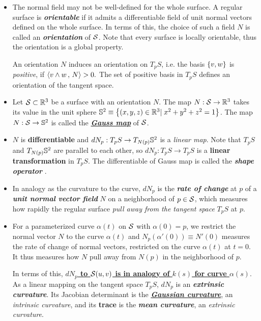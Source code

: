 \documentclass[11pt]{article}
\begin{document}
\begin{itemize}
\item The normal field may not be well-defined for the whole surface. A regular surface is \emph{\textbf{orientable}} if it admits a differentiable  field  of unit normal vectors defined on the whole surface. In terms of this, the choice of such a field $N$ is called an \emph{\textbf{orientation}} of ${\mathcal S}$. Note that every surface is locally orientable, thus the orientation is a global property. 

 An orientation $N$ induces an orientation on $T_{p}S$, i.e. the basis $\left\{v,w\right\}$ is \emph{positive}, if $\left\langle v\wedge w\,,\, N \right\rangle>0.$ The set of positive basis in $T_{p}S$ defines an orientation of the tangent space. 

 \item \begin{definition}
 Let ${\mathcal S}\subset {\mathbb R}^{3}$ be a surface with an orientation $N$. The map $N: {\mathcal S} \rightarrow {\mathbb R}^{3}$ takes its value in the unit sphere ${\mathbb S}^{2}\equiv \left\{(x,y,z)\in {\mathbb R}^{3}|\;  x^{2}+ y^{2}+ z^{2} =1 \right\}$.  The map $N: {\mathcal S} \rightarrow {\mathbb S}^{2}$ is called the \underline{\emph{\textbf{Gauss map}}} of ${\mathcal S}$.
 \end{definition}
 
 \item $N$ is \textbf{differentiable} and $dN_{p}: T_{p}S \rightarrow T_{N(p)}{\mathbb S}^{2}$ is a \emph{linear map}. Note that $T_{p}S$ and $T_{N(p)}{\mathbb S}^{2}$ are parallel to each other, so $dN_{p}: T_{p}S \rightarrow T_{p}S$ is a \textbf{linear transformation} in $T_{p}S$. The differentiable of Gauss map is called the \emph{\textbf{shape operator}} \citep{o2006elementary}. 

\item In analogy as the curvature to the curve, $dN_{p}$ is the \emph{\textbf{rate of change}} at $p$ of a \emph{\textbf{unit normal vector field}} $N$  on a neighborhood of $p\in {\mathcal S}$, which measures how rapidly the regular surface \emph{pull away from the tangent space} $T_{p}S$ at $p$.


\item For a parameterized curve $\alpha(t)$ on ${\mathcal S}$ with $\alpha(0) = p$, we restrict the normal vector $N$ to the curve $\alpha(t)$ and $N_{p}(\alpha'(0)) \equiv N'(0)$ measures the rate of change of normal vectors, restricted on the curve $\alpha(t)$ at $t=0$. It thus measures how $N$ pull away from $N(p)$ in the neighborhood of $p$.  

In terms of this, \underline{\textbf{$dN_{p} $ to ${\mathcal S}(u,v)$  is in analogy of $k(s)$ for curve $\alpha(s)$}}. As a linear mapping on the tangent space $T_{p}S$, $dN_{p}$ is an \emph{\textbf{extrinsic curvature}}. Its Jacobian determinant is the \underline{\emph{\textbf{Gaussian curvature}}}, an \emph{intrinsic curvature}, and its \textbf{trace} is the \emph{\textbf{mean curvature}}, an \emph{extrinsic curvature}. 


\end{itemize}
\end{document}
